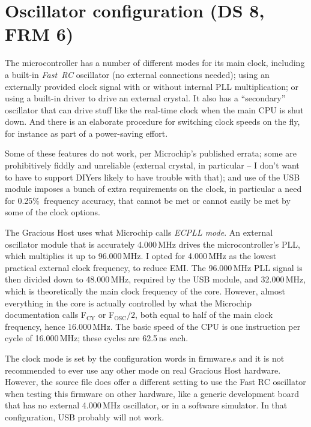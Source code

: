 
\section{Oscillator configuration (DS 8, FRM 6)}

The microcontroller has a number of different modes for its main clock,
including a built-in \emph{Fast~RC} oscillator (no external connections
needed); using an externally provided clock signal with or without internal
PLL multiplication; or using a built-in driver to drive an external crystal. 
It also has a ``secondary'' oscillator that can drive stuff like the
real-time clock when the main CPU is shut down.  And there is an elaborate
procedure for switching clock speeds on the fly, for instance as part of a
power-saving effort.

Some of these features do not work, per Microchip's published errata; some
are prohibitively fiddly and unreliable (external crystal, in particular --
I don't want to have to support DIYers likely to have trouble with that);
and use of the USB module imposes a bunch of extra requirements on the
clock, in particular a need for 0.25\%\ frequency accuracy, that cannot be
met or cannot easily be met by some of the clock options.

The Gracious Host uses what Microchip calls \emph{ECPLL mode}.  An external
oscillator module that is accurately 4.000\,MHz drives the microcontroller's
PLL, which multiplies it up to 96.000\,MHz.  I opted for 4.000\,MHz as the
lowest practical external clock frequency, to reduce EMI.  The 96.000\,MHz PLL
signal is then divided down to 48.000\,MHz, required by the USB module, and
32.000\,MHz, which is theoretically the main clock frequency of the core. 
However, almost everything in the core is actually controlled by what the
Microchip documentation calls F$_\textrm{CY}$ or F$_\textrm{OSC}/2$, both
equal to half of the main clock frequency, hence 16.000\,MHz.  The basic speed
of the CPU is one instruction per cycle of 16.000\,MHz; these cycles are
62.5\,ns each.

The clock mode is set by the configuration words in firmware.s and it is not
recommended to ever use any other mode on real Gracious Host hardware. 
However, the source file does offer a different setting to use the Fast RC
oscillator when testing this firmware on other hardware, like a generic
development board that has no external 4.000\,MHz oscillator, or in a software
simulator.  In that configuration, USB probably will not work.

